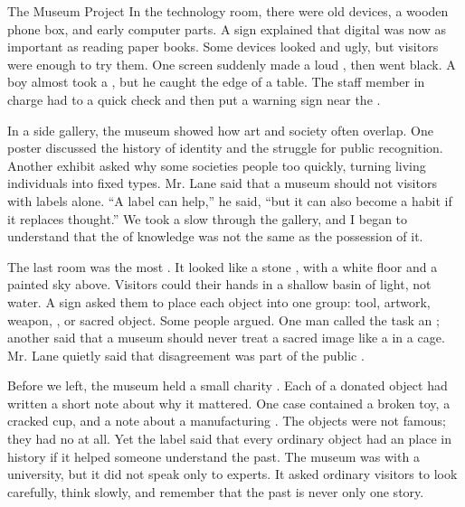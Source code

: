 \documentclass[12pt]{nextbook}
\begin{document}
\begin{readersection}{The Museum Project}
In the technology room, there were old  devices, a wooden phone box, and early computer parts. A sign explained that digital  was now as important as reading paper books. Some devices looked  and ugly, but visitors were  enough to try them. One screen suddenly made a loud , then went black. A boy almost took a , but he caught the edge of a table. The staff member in charge had to  a quick check and then put a warning sign near the .

In a side gallery, the museum showed how art and society often overlap. One poster discussed the history of  identity and the struggle for public recognition. Another exhibit asked why some societies  people too quickly, turning living individuals into fixed types. Mr. Lane said that a museum should not  visitors with labels alone. “A label can help,” he said, “but it can also become a  habit if it replaces thought.” We took a slow  through the gallery, and I began to understand that the  of knowledge was not the same as the possession of it.

The last room was the most . It looked like a stone , with a white  floor and a painted sky above. Visitors could  their hands in a shallow basin of light, not water. A sign asked them to place each object into one group: tool, artwork, weapon, , or sacred object. Some people argued. One man called the task an ; another said that a museum should never treat a sacred image like a  in a cage. Mr. Lane quietly said that disagreement was part of the public .

Before we left, the museum held a small charity . Each  of a donated object had written a short note about why it mattered. One case contained a broken toy, a cracked cup, and a note about a manufacturing . The objects were not famous; they had no  at all. Yet the label said that every ordinary object had an  place in history if it helped someone understand the past. The museum was  with a university, but it did not speak only to experts. It asked ordinary visitors to look carefully, think slowly, and remember that the past is never only one story.
\end{readersection}
\end{document}
